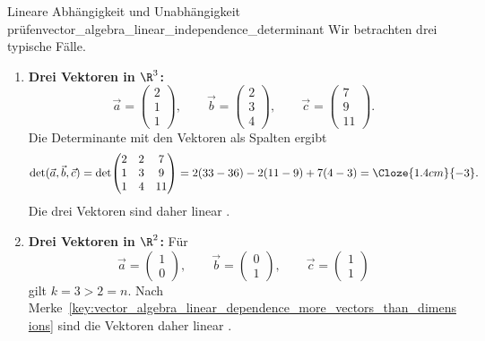 \begin{ExampleBox}{Lineare Abhängigkeit und Unabhängigkeit prüfen}{vector_algebra_linear_independence_determinant}
  Wir betrachten drei typische Fälle.
  \begin{enumerate}[label=\alph*),leftmargin=*,itemsep=0.8em]
    \item \textbf{Drei Vektoren in $\R^3$:}
      \[
        \vec a=\begin{pmatrix}2\\1\\1\end{pmatrix},\qquad
        \vec b=\begin{pmatrix}2\\3\\4\end{pmatrix},\qquad
        \vec c=\begin{pmatrix}7\\9\\11\end{pmatrix}.
      \]
      Die Determinante mit den Vektoren als Spalten ergibt
      \[
        \det(\vec a,\vec b,\vec c)
        =\det\!\begin{pmatrix}
          2&2&7\\
          1&3&9\\
          1&4&11
        \end{pmatrix}
        =2(33-36)-2(11-9)+7(4-3)
        =\Cloze{1.4cm}{-3}.
      \]
      Die drei Vektoren sind daher linear .

    \item \textbf{Drei Vektoren in $\R^2$:}
      Für
      \[
        \vec a=\begin{pmatrix}1\\0\end{pmatrix},\qquad
        \vec b=\begin{pmatrix}0\\1\end{pmatrix},\qquad
        \vec c=\begin{pmatrix}1\\1\end{pmatrix}
      \]
      gilt $k=3>2=n$. Nach Merke~\ref{key:vector_algebra_linear_dependence_more_vectors_than_dimensions}
      sind die Vektoren daher linear .


\end{enumerate}
\end{ExampleBox}
